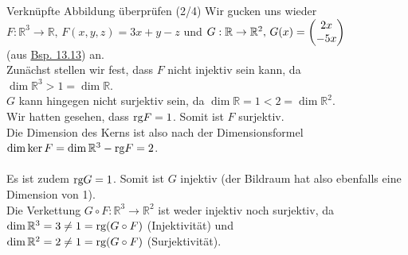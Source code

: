 \begin{Beispiel}
{Verknüpfte Abbildung überprüfen (2/4)}
Wir gucken uns wieder\\
$F:\mathbb{R}^3\to\mathbb{R},\,F(x,y,z)=3x+y-z$ und $G:\mathbb{R}\to \mathbb{R}^2,\,G(x)=\begin{pmatrix}2x\\-5x\end{pmatrix}$\\
(aus \hyperref[beisp:12VerknupfungLinAbb]{Bsp. 13.13}) an.\\
Zunächst stellen wir fest, dass $F$ nicht injektiv sein kann, da $\dim \mathbb{R}^3>1=\dim \mathbb{R}$.\\
$G$ kann hingegen nicht surjektiv sein, da $\dim \mathbb{R}=1<2=\dim\mathbb{R}^2$.\\
Wir hatten gesehen, dass $\text{rg} F=1$. Somit ist $F$ surjektiv.\\
Die Dimension des Kerns ist also nach der Dimensionsformel\\
$\dim\ker F=\dim \mathbb{R}^3-\text{rg} F=2$.\\
\\
Es ist zudem $\text{rg} G=1$. Somit ist $G$ injektiv (der Bildraum hat also ebenfalls eine Dimension von 1).\\
Die Verkettung $G\circ F:\mathbb{R}^3\to \mathbb{R}^2$ ist weder injektiv noch surjektiv, da\\
$\dim\mathbb{R}^3=3\neq1=\text{rg}(G\circ F)$ (\Lightning Injektivität) und\\ $\dim \mathbb{R}^2=2\neq 1=\text{rg}(G\circ F)$ (\Lightning Surjektivität).
\end{Beispiel}

